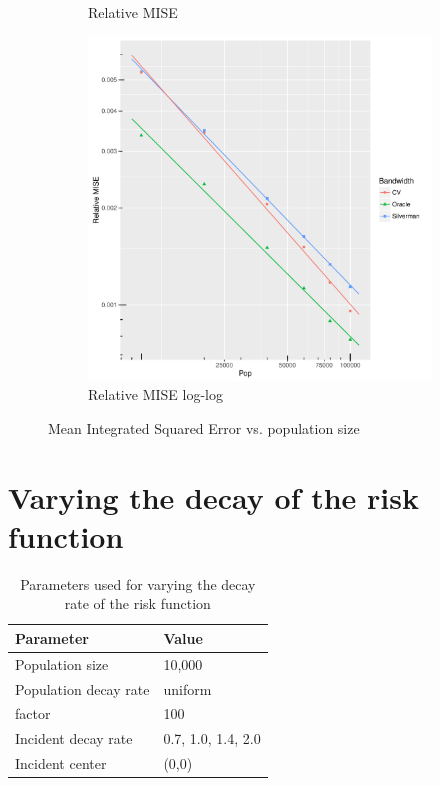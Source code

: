 \begin{figure}[htbp]
\begin{subfigure}[b]{0.3\textwidth}
    \caption{Relative MISE}
    \end{subfigure}
    \begin{subfigure}[b]{0.3\textwidth}
    \includegraphics[width=\textwidth]{results/by_pop_size/RMISE-vs-population-log-log}
    \caption{Relative MISE log-log}
    \end{subfigure}
    \caption[MISE: by population size]{Mean Integrated Squared Error vs. population size}
    \label{fig:ise:unifNpop_1h}
\end{figure}


\section{Varying the decay of the risk function}
\label{sec:results:unif_100_SD}

\begin{table}[htbp]
\centering
\begin{tabular}{ll}
\hline
Parameter & Value \\
\hline
Population size & 10,000 \\
Population decay rate & uniform \\
\Gls{factor} & 100 \\
Incident decay rate & 0.7, 1.0, 1.4, 2.0 \\
Incident center & (0,0) \\
\hline
\end{tabular}
\caption{Parameters used for varying the decay rate of the risk function}
\label{tab:params:unif_100_SD}
\end{table}

